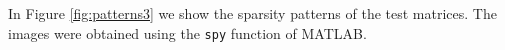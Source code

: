In Figure \ref{fig:patterns3} we show the sparsity patterns of the test matrices. The images were obtained using the \verb|spy| function of MATLAB.

\begin{figure}[h]
	\centering
	

\end{figure}
